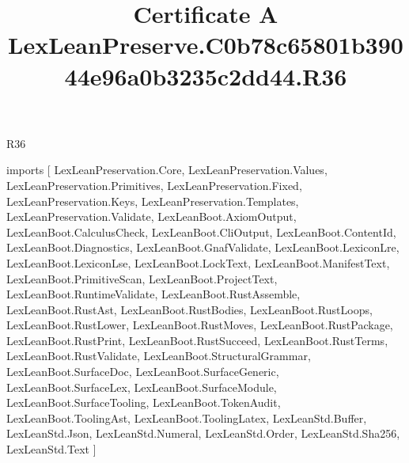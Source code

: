\begin{lexlean}{R36}
\title{Certificate A LexLeanPreserve.C0b78c65801b39044e96a0b3235c2dd44.R36}
\begin{coremodule}
imports [
  LexLeanPreservation.Core,
  LexLeanPreservation.Values,
  LexLeanPreservation.Primitives,
  LexLeanPreservation.Fixed,
  LexLeanPreservation.Keys,
  LexLeanPreservation.Templates,
  LexLeanPreservation.Validate,
  LexLeanBoot.AxiomOutput,
  LexLeanBoot.CalculusCheck,
  LexLeanBoot.CliOutput,
  LexLeanBoot.ContentId,
  LexLeanBoot.Diagnostics,
  LexLeanBoot.GnafValidate,
  LexLeanBoot.LexiconLre,
  LexLeanBoot.LexiconLse,
  LexLeanBoot.LockText,
  LexLeanBoot.ManifestText,
  LexLeanBoot.PrimitiveScan,
  LexLeanBoot.ProjectText,
  LexLeanBoot.RuntimeValidate,
  LexLeanBoot.RustAssemble,
  LexLeanBoot.RustAst,
  LexLeanBoot.RustBodies,
  LexLeanBoot.RustLoops,
  LexLeanBoot.RustLower,
  LexLeanBoot.RustMoves,
  LexLeanBoot.RustPackage,
  LexLeanBoot.RustPrint,
  LexLeanBoot.RustSucceed,
  LexLeanBoot.RustTerms,
  LexLeanBoot.RustValidate,
  LexLeanBoot.StructuralGrammar,
  LexLeanBoot.SurfaceDoc,
  LexLeanBoot.SurfaceGeneric,
  LexLeanBoot.SurfaceLex,
  LexLeanBoot.SurfaceModule,
  LexLeanBoot.SurfaceTooling,
  LexLeanBoot.TokenAudit,
  LexLeanBoot.ToolingAst,
  LexLeanBoot.ToolingLatex,
  LexLeanStd.Buffer,
  LexLeanStd.Json,
  LexLeanStd.Numeral,
  LexLeanStd.Order,
  LexLeanStd.Sha256,
  LexLeanStd.Text
]


\end{coremodule}
\end{lexlean}
